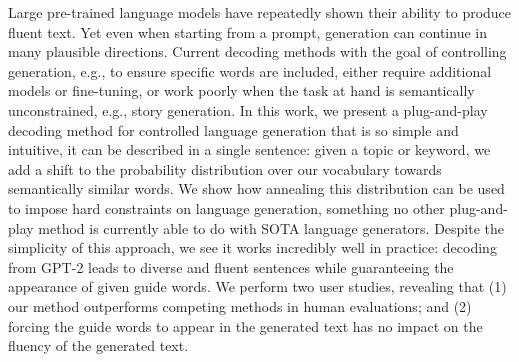 Large pre-trained language models have repeatedly shown their ability to produce fluent text. Yet even when starting from a prompt, generation can continue in many plausible directions. Current decoding methods with the goal of controlling generation, e.g., to ensure specific words are included, either require additional models or fine-tuning, or work poorly when the task at hand is semantically unconstrained, e.g., story generation. In this work, we present a plug-and-play decoding method for controlled language generation that is so simple and intuitive, it can be described in a single sentence: given a topic or keyword, we add a shift to the probability distribution over our vocabulary towards semantically similar words. We show how annealing this distribution can be used to impose hard constraints on language generation, something no other plug-and-play method is currently able to do with SOTA language generators. Despite the simplicity of this approach, we see it works incredibly well in practice: decoding from GPT-2 leads to diverse and fluent sentences while guaranteeing the appearance of given guide words. We perform two user studies, revealing that (1) our method outperforms competing methods in human evaluations; and (2) forcing the guide words to appear in the generated text has no impact on the fluency of the generated text.
